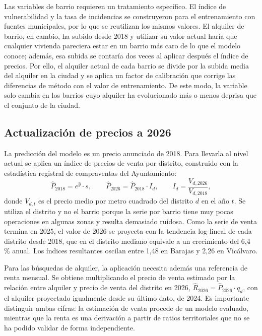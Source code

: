 \documentclass[11pt,a4paper]{article}
\begin{document}
Las variables de barrio requieren un tratamiento específico. El índice de vulnerabilidad y la tasa de incidencias se construyeron para el entrenamiento con fuentes municipales, por lo que se reutilizan los mismos valores. El alquiler de barrio, en cambio, ha subido desde 2018 y utilizar su valor actual haría que cualquier vivienda pareciera estar en un barrio más caro de lo que el modelo conoce; además, esa subida se contaría dos veces al aplicar después el índice de precios. Por ello, el alquiler actual de cada barrio se divide por la subida media del alquiler en la ciudad y se aplica un factor de calibración que corrige las diferencias de método con el valor de entrenamiento. De este modo, la variable solo cambia en los barrios cuyo alquiler ha evolucionado más o menos deprisa que el conjunto de la ciudad.

\subsection{Actualización de precios a 2026}

La predicción del modelo es un precio anunciado de 2018. Para llevarla al nivel actual se aplica un índice de precios de venta por distrito, construido con la estadística registral de compraventas del Ayuntamiento:
\begin{equation*}
\hat{P}_{2018} = e^{\hat{y}} \cdot s, \qquad \hat{P}_{2026} = \hat{P}_{2018} \cdot I_d, \qquad I_d = \frac{V_{d,2026}}{V_{d,2018}},
\end{equation*}
donde $V_{d,t}$ es el precio medio por metro cuadrado del distrito $d$ en el año $t$. Se utiliza el distrito y no el barrio porque la serie por barrio tiene muy pocas operaciones en algunas zonas y resulta demasiado ruidosa. Como la serie de venta termina en 2025, el valor de 2026 se proyecta con la tendencia log-lineal de cada distrito desde 2018, que en el distrito mediano equivale a un crecimiento del 6,4 \% anual. Los índices resultantes oscilan entre 1,48 en Barajas y 2,26 en Vicálvaro.

Para las búsquedas de alquiler, la aplicación necesita además una referencia de renta mensual. Se obtiene multiplicando el precio de venta estimado por la relación entre alquiler y precio de venta del distrito en 2026, $\hat{R}_{2026} = \hat{P}_{2026} \cdot q_d$, con el alquiler proyectado igualmente desde su último dato, de 2024. Es importante distinguir ambas cifras: la estimación de venta procede de un modelo evaluado, mientras que la renta es una derivación a partir de ratios territoriales que no se ha podido validar de forma independiente.
\end{document}
